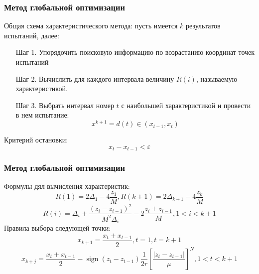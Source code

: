 \documentclass[aspectratio=1610]{beamer}
\DeclareMathOperator{\sign}{sign}
\begin{document}
\begin{frame}
  \frametitle{Метод глобальной оптимизации}
  Общая схема характеристического метода:
  пусть имеется \(k\) результатов испытаний, далее:
  \begin{enumerate}
    \setlength{\itemindent}{.1in}
    \item[Шаг 1.] Упорядочить поисковую информацию по возрастанию
    координат точек испытаний
    \item[Шаг 2.] Вычислить для каждого интервала
    величину \(R(i)\), называемую характеристикой.
    \item[Шаг 3.] Выбрать интервал номер \(t\) с наибольшей
    характеристикой и провести в нем испытание:
    \begin{displaymath}
      x^{k+1}=d(t)\in (x_{t-1}, x_t)
    \end{displaymath}
  \end{enumerate}

  Критерий остановки:
  \begin{displaymath}
    x_t - x_{t-1} < \varepsilon
  \end{displaymath}
\end{frame}

\begin{frame}
  \frametitle{Метод глобальной оптимизации}
  Формулы дял вычисления характеристик:
  \begin{displaymath}
    R(1)=2\Delta_1-4\dfrac{z_1}{M},R(k+1)=2\Delta_{k+1}-4\dfrac{z_k}{M}
  \end{displaymath}
  \begin{displaymath}
    R(i)=\Delta_i+\dfrac{(z_i-z_{i-1})^2}{M^2\Delta_i}-2\dfrac{z_i+z_{i-1}}{M},1<i<k+1
  \end{displaymath}
  Правила выбора следующей точки:
  \begin{displaymath}
    x_{k+1}=\dfrac{x_{t}+x_{t-1}}{2},t=1,t=k+1
  \end{displaymath}
  \begin{displaymath}
    x_{k+j}=\dfrac{x_{t}+x_{t-1}}{2}-\sign(z_{t}-z_{t-1})\dfrac{1}{2r}\left[\dfrac{|z_{t}-z_{t-1}|}{\mu}\right]^N,1<t<k+1
  \end{displaymath}
\end{frame}
\end{document}
